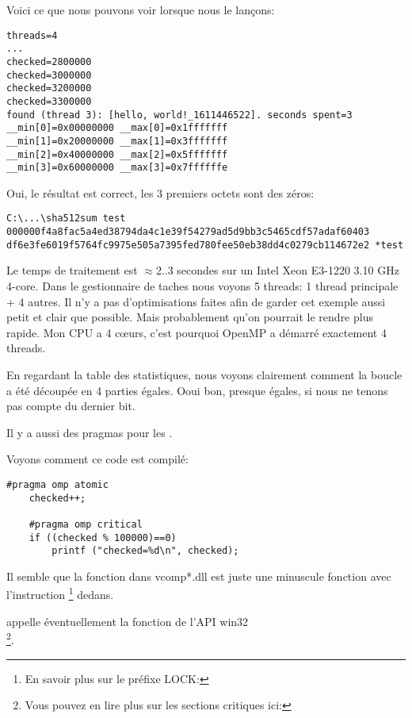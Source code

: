 Voici ce que nous pouvons voir lorsque nous le lançons:

\begin{lstlisting}
threads=4
...
checked=2800000
checked=3000000
checked=3200000
checked=3300000
found (thread 3): [hello, world!_1611446522]. seconds spent=3
__min[0]=0x00000000 __max[0]=0x1fffffff
__min[1]=0x20000000 __max[1]=0x3fffffff
__min[2]=0x40000000 __max[2]=0x5fffffff
__min[3]=0x60000000 __max[3]=0x7ffffffe
\end{lstlisting}

Oui, le résultat est correct, les 3 premiers octets sont des zéros:

\begin{lstlisting}
C:\...\sha512sum test
000000f4a8fac5a4ed38794da4c1e39f54279ad5d9bb3c5465cdf57adaf60403
df6e3fe6019f5764fc9975e505a7395fed780fee50eb38dd4c0279cb114672e2 *test
\end{lstlisting}

Le temps de traitement est $\approx2..3$ secondes sur un Intel Xeon E3-1220 3.10 GHz 4-core.
Dans le gestionnaire de taches nous voyons 5 threads:
1 thread principale + 4 autres.
Il n'y a pas d'optimisations faites afin de garder cet exemple aussi petit et clair
que possible.
Mais probablement qu'on pourrait le rendre plus rapide.
Mon \ac{CPU} a 4 c\oe{}urs, c'est pourquoi OpenMP a démarré exactement 4 threads.

En regardant la table des statistiques, nous voyons clairement comment la boucle
a été découpée en 4 parties égales.
Ooui bon, presque égales, si nous ne tenons pas compte du dernier bit.

Il y a aussi des pragmas pour les .

Voyons comment ce code est compilé:

\begin{lstlisting}[style=customc]
	#pragma omp atomic
	checked++;

	#pragma omp critical
	if ((checked % 100000)==0)
		printf ("checked=%d\n", checked);
\end{lstlisting}



Il semble que la fonction  dans vcomp*.dll est juste
une minuscule fonction avec l'instruction \footnote{En savoir plus sur le préfixe LOCK: }
dedans.

appelle éventuellement la fonction de l'\ac{API} win32 \\
\footnote{Vous pouvez en lire plus sur les sections critiques ici: }.

